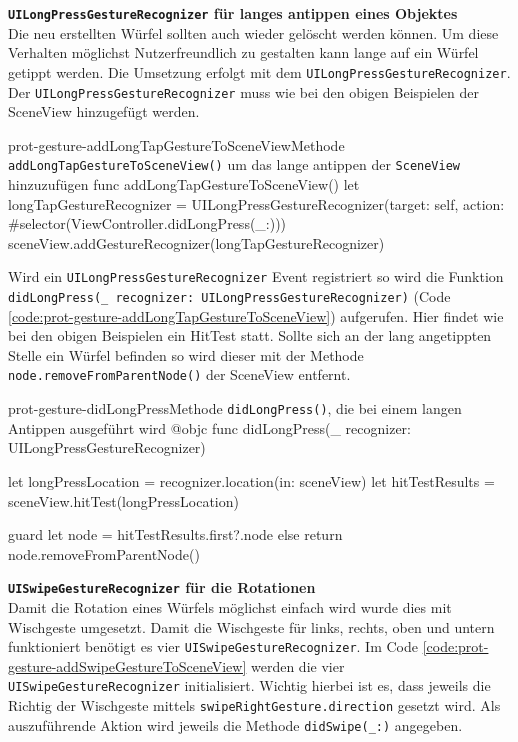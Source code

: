\begin{description}
    \textbf{\texttt{UILongPressGestureRecognizer} für langes antippen eines Objektes}\\
    Die neu erstellten Würfel sollten auch wieder gelöscht werden können. Um diese Verhalten möglichst Nutzerfreundlich zu gestalten kann lange auf ein Würfel getippt werden. Die Umsetzung erfolgt mit dem \texttt{UILongPressGestureRecognizer}. Der \texttt{UILongPressGestureRecognizer} muss wie bei den obigen Beispielen der SceneView hinzugefügt werden.

    \begin{code}{prot-gesture-addLongTapGestureToSceneView}{Methode \texttt{addLongTapGestureToSceneView()} um das lange antippen der \texttt{SceneView} hinzuzufügen}
    func addLongTapGestureToSceneView() {
        let longTapGestureRecognizer = UILongPressGestureRecognizer(target: self, action: #selector(ViewController.didLongPress(\_:)))
        sceneView.addGestureRecognizer(longTapGestureRecognizer)
    }
    \end{code}

    Wird ein \texttt{UILongPressGestureRecognizer} Event registriert so wird die Funktion \texttt{didLongPress(\_ recognizer: UILongPressGestureRecognizer)} (Code \ref{code:prot-gesture-addLongTapGestureToSceneView}) aufgerufen. Hier findet wie bei den obigen Beispielen ein HitTest statt. Sollte sich an der lang angetippten Stelle ein Würfel befinden so wird dieser mit der Methode \texttt{node.removeFromParentNode()} der SceneView entfernt.

    \begin{code}{prot-gesture-didLongPress}{Methode \texttt{didLongPress()}, die bei einem langen Antippen ausgeführt wird}
    @objc
    func didLongPress(\_ recognizer: UILongPressGestureRecognizer) {
        let longPressLocation = recognizer.location(in: sceneView)
        let hitTestResults = sceneView.hitTest(longPressLocation)
        
        guard let node = hitTestResults.first?.node else { return }
        node.removeFromParentNode()
    }
    \end{code}
    
    \textbf{\texttt{UISwipeGestureRecognizer} für die Rotationen}\\
    Damit die Rotation eines Würfels möglichst einfach wird wurde dies mit Wischgeste umgesetzt. Damit die Wischgeste für links, rechts, oben und untern funktioniert benötigt es vier \texttt{UISwipeGestureRecognizer}. Im Code \ref{code:prot-gesture-addSwipeGestureToSceneView} werden die vier \texttt{UISwipeGestureRecognizer} initialisiert. Wichtig hierbei ist es, dass jeweils die Richtig der Wischgeste mittels \texttt{swipeRightGesture.direction} gesetzt wird. Als auszuführende Aktion wird jeweils die Methode \texttt{didSwipe(\_:)} angegeben.


\end{description}

